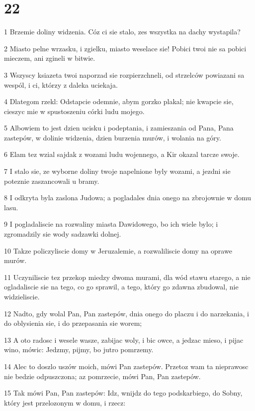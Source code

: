 \chapter{22}

\par 1 Brzemie doliny widzenia. Cóz ci sie stalo, zes wszystka na dachy wystapila?
\par 2 Miasto pelne wrzasku, i zgielku, miasto weselace sie! Pobici twoi nie sa pobici mieczem, ani zgineli w bitwie.
\par 3 Wszyscy ksiazeta twoi naporzad sie rozpierzchneli, od strzelców powiazani sa wespól, i ci, którzy z daleka uciekaja.
\par 4 Dlategom rzekl: Odstapcie odemnie, abym gorzko plakal; nie kwapcie sie, cieszyc mie w spustoszeniu córki ludu mojego.
\par 5 Albowiem to jest dzien ucisku i podeptania, i zamieszania od Pana, Pana zastepów, w dolinie widzenia, dzien burzenia murów, i wolania na góry.
\par 6 Elam tez wzial sajdak z wozami ludu wojennego, a Kir okazal tarcze swoje.
\par 7 I stalo sie, ze wyborne doliny twoje napelnione byly wozami, a jezdni sie poteznie zaszancowali u bramy.
\par 8 I odkryta byla zaslona Judowa; a pogladales dnia onego na zbrojownie w domu lasu.
\par 9 I pogladaliscie na rozwaliny miasta Dawidowego, bo ich wiele bylo; i zgromadzily sie wody sadzawki dolnej.
\par 10 Takze policzyliscie domy w Jeruzalemie, a rozwaliliscie domy na oprawe murów.
\par 11 Uczyniliscie tez przekop miedzy dwoma murami, dla wód stawu starego, a nie ogladaliscie sie na tego, co go sprawil, a tego, który go zdawna zbudowal, nie widzieliscie.
\par 12 Nadto, gdy wolal Pan, Pan zastepów, dnia onego do placzu i do narzekania, i do oblysienia sie, i do przepasania sie worem;
\par 13 A oto radosc i wesele wasze, zabijac woly, i bic owce, a jedzac mieso, i pijac wino, mówic: Jedzmy, pijmy, bo jutro pomrzemy.
\par 14 Alec to doszlo uszów moich, mówi Pan zastepów. Przetoz wam ta nieprawosc nie bedzie odpuszczona; az pomrzecie, mówi Pan, Pan zastepów.
\par 15 Tak mówi Pan, Pan zastepów: Idz, wnijdz do tego podskarbiego, do Sobny, który jest przelozonym w domu, i rzecz:
